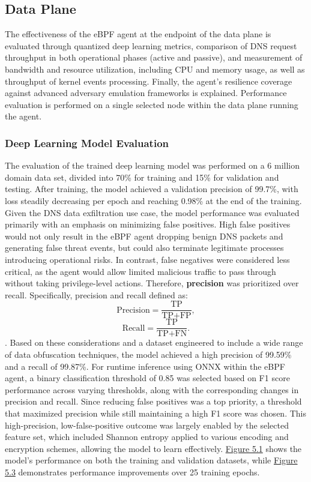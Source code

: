 \documentclass [11pt, proquest] {uwthesis}[2020/02/24]
\begin{document}
\subsection{Data Plane}
The effectiveness of the eBPF agent at the endpoint of the data plane is evaluated through quantized deep learning metrics, comparison of DNS request throughput in both operational phases (active and passive), and measurement of bandwidth and resource utilization, including CPU and memory usage, as well as throughput of kernel events processing. Finally, the agent’s resilience coverage against advanced adversary emulation frameworks is explained. Performance evaluation is performed on a single selected node within the data plane running the agent.

\subsubsection{Deep Learning Model Evaluation}
The evaluation of the trained deep learning model was performed on a 6 million domain data set, divided into 70\% for training and 15\% for validation and testing. After training, the model achieved a validation precision of 99.7\%, with loss steadily decreasing per epoch and reaching 0.98\% at the end of the training. Given the DNS data exfiltration use case, the model performance was evaluated primarily with an emphasis on minimizing false positives. High false positives would not only result in the eBPF agent dropping benign DNS packets and generating false threat events, but could also terminate legitimate processes introducing operational risks. In contrast, false negatives were considered less critical, as the agent would allow limited malicious traffic to pass through without taking privilege-level actions. Therefore, \textbf{precision} was prioritized over recall. Specifically, precision and recall defined as:
\[
\text{Precision} = \frac{\text{TP}}{\text{TP} + \text{FP}},
\]
\[
\text{Recall} = \frac{\text{TP}}{\text{TP} + \text{FN}}.
\]
. Based on these considerations and a dataset engineered to include a wide range of data obfuscation techniques, the model achieved a high precision of 99.59\% and a recall of 99.87\%. For runtime inference using ONNX within the eBPF agent, a binary classification threshold of 0.85 was selected based on F1 score performance across varying thresholds, along with the corresponding changes in precision and recall. Since reducing false positives was a top priority, a threshold that maximized precision while still maintaining a high F1 score was chosen. This high-precision, low-false-positive outcome was largely enabled by the selected feature set, which included Shannon entropy applied to various encoding and encryption schemes, allowing the model to learn effectively. \hyperref[model-evaluation-metrics]{Figure 5.1} shows the model’s performance on both the training and validation datasets, while \hyperref[fig:model_metrics_quadrant]{Figure 5.3} demonstrates performance improvements over 25 training epochs.
\end{document}
